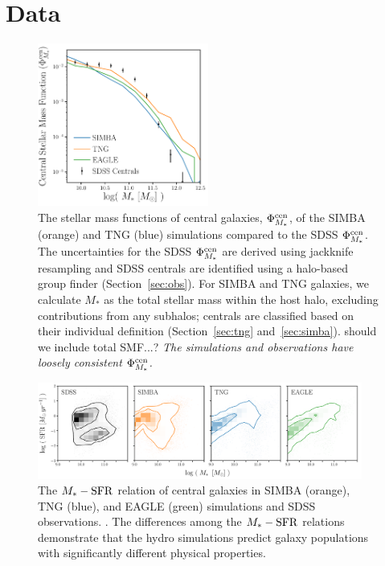 \section{Data}\label{sec:sims}
\begin{figure}
\begin{center}
\includegraphics[width=0.5\textwidth]{figs/smfs.pdf} 
    \caption{The stellar mass functions of central galaxies, $\Phi^{\rm
    cen}_{M_*}$, of the SIMBA (orange) and TNG (blue) simulations compared to
    the SDSS $\Phi^{\rm cen}_{M_*}$. The uncertainties for the SDSS $\Phi^{\rm
    cen}_{M_*}$ are derived using jackknife resampling and SDSS centrals are
    identified using a halo-based group finder (Section~\ref{sec:obs}). For
    SIMBA and TNG galaxies, we calculate $M_*$ as the total stellar mass within
    the host halo, excluding contributions from any subhalos; centrals are
    classified based on their individual definition (Section~\ref{sec:tng}
    and~\ref{sec:simba}). {\color{red} should we include total SMF...?} 
    {\em The simulations and observations have loosely consistent $\Phi^{\rm
    cen}_{M_*}$.} 
    }
\label{fig:smf}
\end{center}
\end{figure}

\begin{figure}
\begin{center}
\includegraphics[width=0.95\textwidth]{figs/m_sfr.pdf} 
    \caption{\label{fig:msfr}
    The $M_*-{\rm SFR}$ relation of central galaxies in SIMBA (orange), TNG (blue),
    and EAGLE (green) simulations and SDSS observations. . 
    The differences among the $M_*-{\rm SFR}$ relations demonstrate that the hydro
    simulations predict galaxy populations with significantly different
    physical properties. 
    }
\end{center}
\end{figure}

